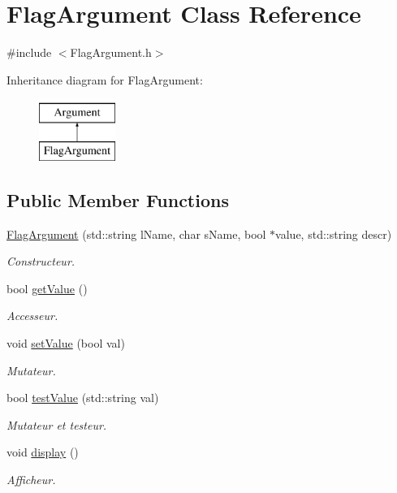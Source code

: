 \hypertarget{classFlagArgument}{\section{Flag\-Argument Class Reference}
\label{classFlagArgument}
}


{\ttfamily \#include $<$Flag\-Argument.\-h$>$}

Inheritance diagram for Flag\-Argument\-:\begin{figure}[H]
\begin{center}
\leavevmode
\includegraphics[height=2.000000cm]{classFlagArgument}
\end{center}
\end{figure}
\subsection*{Public Member Functions}
\begin{DoxyCompactItemize}
\item 
\hyperlink{classFlagArgument_aef16024973942f8be515c430e0a90c66}{Flag\-Argument} (std\-::string l\-Name, char s\-Name, bool $\ast$value, std\-::string descr)
\begin{DoxyCompactList}\small\item\em Constructeur. \end{DoxyCompactList}\item 
bool \hyperlink{classFlagArgument_a78f4e074860e7a358097e0b3814aab3f}{get\-Value} ()
\begin{DoxyCompactList}\small\item\em Accesseur. \end{DoxyCompactList}\item 
void \hyperlink{classFlagArgument_ab663d3b44ceb27bb2cee27b91f13363d}{set\-Value} (bool val)
\begin{DoxyCompactList}\small\item\em Mutateur. \end{DoxyCompactList}\item 
bool \hyperlink{classFlagArgument_a881f9de4811858463a4a981d3ebedb79}{test\-Value} (std\-::string val)
\begin{DoxyCompactList}\small\item\em Mutateur et testeur. \end{DoxyCompactList}\item 
void \hyperlink{classFlagArgument_ab79ece26d0d7462dd491ba0c67bb95d2}{display} ()
\begin{DoxyCompactList}\small\item\em Afficheur. \end{DoxyCompactList}\end{DoxyCompactItemize}


